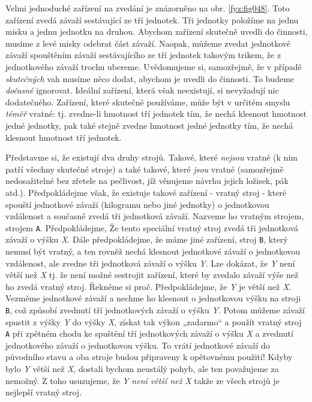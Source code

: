 {    Velmi jednoduché zařízení na zvedání je znázorněno na obr. \ref{fyz:fig048}. Toto zařízení 
    zvedá závaží sestávající ze tří jednotek. Tři jednotky položíme na jednu misku a jednu jednotku 
    na druhou. Abychom zařízení skutečně uvedli do činnosti, musíme z levé misky odebrat část 
    závaží. Naopak, můžeme zvedat jednotkové závaží spouštěním závaží sestávajícího ze tří jednotek 
    takovým trikem, že z jednotkového závaží trochu ubereme. Uvědomujeme si, samozřejmě, že v 
    případě \emph{skutečných} vah musíme něco dodat, abychom je uvedli do činnosti. To budeme 
    \emph{dočasné} ignorovat. Ideální zařízení, která však neexistují, si nevyžadují nic 
    dodatečného. Zařízení, které skutečně používáme, může být v určitém smyslu \emph{téměř} vratné: 
    tj. zvedne-li hmotnost tří jednotek tím, že nechá klesnout hmotnost jedné jednotky, pak také 
    stejně zvedne hmotnost jedné jednotky tím, že nechá klesnout hmotnost tří jednotek.
    
    Představme si, že existují dva druhy strojů. Takové, které \emph{nejsou} vratné (k nim patří 
    všechny skutečné stroje) a také takové, které \emph{jsou} vratné (samozřejmě nedosažitelné bez 
    zřetele na pečlivost, jíž věnujeme návrhu jejich ložisek, pák atd.). Předpokládejme však, že 
    existuje takové zařízení - vratný stroj - které spouští jednotkové závaží (kilogramu nebo jiné 
    jednotky) o jednotkovou vzdálenost a současně zvedá tři jednotková závaží. Nazveme ho vratným 
    strojem, strojem \texttt{A}. Předpokládejme, Že tento speciální vratný stroj zvedá tři 
    jednotková závaží o výšku \emph{X}. Dále předpokládejme, že máme jiné zařízení, stroj 
    \texttt{B}, který nemusí být vratný, a ten rovněž nechá klesnout jednotkové závaží o 
    jednotkovou vzdálenost, ale zvedne tři jednotková závaží o výšku \emph{Y}. Lze dokázat, že 
    \emph{Y} není větší než \emph{X} tj. že není možné sestrojit zařízení, které by zvedalo závaží 
    výše než ho zvedá vratný stroj. Řekněme si proč. Předpokládejme, že \emph{Y} je větší než 
    \emph{X}. Vezměme jednotkové závaží a nechme ho klesnout o jednotkovou výšku na stroji 
    \texttt{B}, což způsobí zvednutí tří jednotkových závaží o výšku \emph{Y}. Potom můžeme závaží 
    spustit z výšky \emph{Y} do výšky \emph{X}, získat tak výkon „zadarmo“ a použít vratný stroj 
    \texttt{A} při zpětném chodu ke spuštění tří jednotkových závaží o výšku \emph{X} a zvednutí 
    jednotkového závaží o jednotkovou výšku. To vrátí jednotkové závaží do původního stavu a oba 
    stroje budou připraveny k opětovnému použití! Kdyby bylo \emph{Y} větší než \emph{X}, dostali 
    bychom neustálý pohyb, ale ten považujeme za nemožný. Z toho usuzujeme, že \emph{Y} \emph{není 
    větší než} \emph{X} takže ze všech strojů je nejlepší vratný stroj.
    
}
